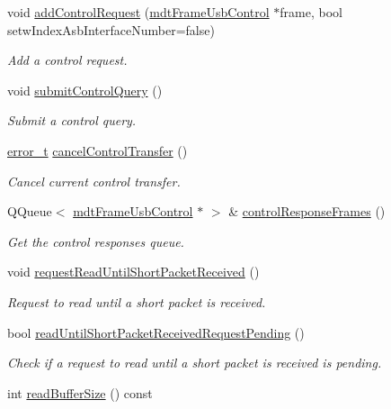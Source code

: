 \begin{DoxyCompactItemize}
void \hyperlink{classmdt_usb_port_a4fbcd0fcc179335c55c6d7ccc40a7c31}{add\-Control\-Request} (\hyperlink{classmdt_frame_usb_control}{mdt\-Frame\-Usb\-Control} $\ast$frame, bool setw\-Index\-Asb\-Interface\-Number=false)
\begin{DoxyCompactList}\small\item\em Add a control request. \end{DoxyCompactList}\item 
void \hyperlink{classmdt_usb_port_a274b6fd10bd84027bb66773ed805de2a}{submit\-Control\-Query} ()
\begin{DoxyCompactList}\small\item\em Submit a control query. \end{DoxyCompactList}\item 
\hyperlink{classmdt_abstract_port_ad4121bb930c95887e77f8bafa065a85e}{error\-\_\-t} \hyperlink{classmdt_usb_port_a6566e654df8a1c3503941702593db3c5}{cancel\-Control\-Transfer} ()
\begin{DoxyCompactList}\small\item\em Cancel current control transfer. \end{DoxyCompactList}\item 
Q\-Queue$<$ \hyperlink{classmdt_frame_usb_control}{mdt\-Frame\-Usb\-Control} $\ast$ $>$ \& \hyperlink{classmdt_usb_port_a304825c7d9173a3dcb5e26a412f1038b}{control\-Response\-Frames} ()
\begin{DoxyCompactList}\small\item\em Get the control responses queue. \end{DoxyCompactList}\item 
void \hyperlink{classmdt_usb_port_a719fc7b43461a3e2d9a4926d3e3961c2}{request\-Read\-Until\-Short\-Packet\-Received} ()
\begin{DoxyCompactList}\small\item\em Request to read until a short packet is received. \end{DoxyCompactList}\item 
bool \hyperlink{classmdt_usb_port_a3c0685d67fe608abe24c140c2858779c}{read\-Until\-Short\-Packet\-Received\-Request\-Pending} ()
\begin{DoxyCompactList}\small\item\em Check if a request to read until a short packet is received is pending. \end{DoxyCompactList}\item 
int \hyperlink{classmdt_usb_port_af546a031ed8621fee1d5e9498cbcd174}{read\-Buffer\-Size} () const 

\end{DoxyCompactItemize}

